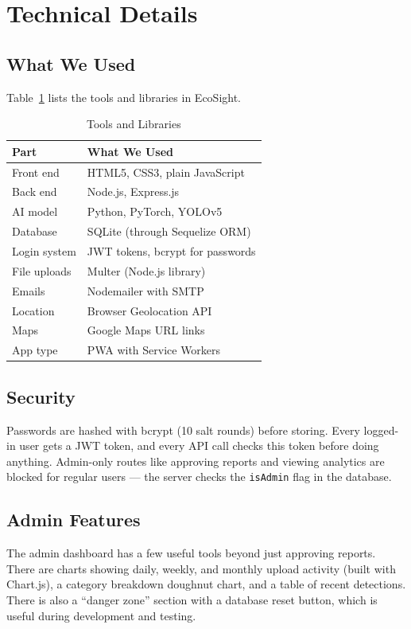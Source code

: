 \documentclass[conference]{IEEEtran}
\begin{document}
\section{Technical Details}

\subsection{What We Used}
Table~\ref{tab:stack} lists the tools and libraries in EcoSight.

\begin{table}[H]
\centering
\caption{Tools and Libraries}
\label{tab:stack}
\begin{tabular}{@{}ll@{}}
\toprule
\textbf{Part} & \textbf{What We Used} \\
\midrule
Front end & HTML5, CSS3, plain JavaScript \\
Back end & Node.js, Express.js \\
AI model & Python, PyTorch, YOLOv5 \\
Database & SQLite (through Sequelize ORM) \\
Login system & JWT tokens, bcrypt for passwords \\
File uploads & Multer (Node.js library) \\
Emails & Nodemailer with SMTP \\
Location & Browser Geolocation API \\
Maps & Google Maps URL links \\
App type & PWA with Service Workers \\
\bottomrule
\end{tabular}
\end{table}

\subsection{Security}
Passwords are hashed with bcrypt (10 salt rounds) before storing. Every logged-in user gets a JWT token, and every API call checks this token before doing anything. Admin-only routes like approving reports and viewing analytics are blocked for regular users — the server checks the \texttt{isAdmin} flag in the database.

\subsection{Admin Features}
The admin dashboard has a few useful tools beyond just approving reports. There are charts showing daily, weekly, and monthly upload activity (built with Chart.js), a category breakdown doughnut chart, and a table of recent detections. There is also a ``danger zone'' section with a database reset button, which is useful during development and testing.
\end{document}
